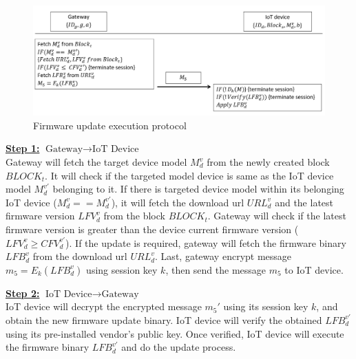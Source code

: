 \begin{figure}[H]
	\begin{center}
		\includegraphics[width=1.0\textwidth]{figures/firmware_update_execution_2.png}
		\caption{Firmware update execution protocol} 
		\label{fig:executionprocessprotocol}
	\end{center}
\end{figure}

\noindent \underline{\textbf{Step 1:}} $\text{Gateway}\rightarrow\text{IoT Device}$ \\
\indent Gateway will fetch the target device model $M_d^v$ from the newly created block $BLOCK_t$. It will check if the targeted model device is same as the IoT device model $M_d^{v'}$ belonging to it. If there is targeted device model within its belonging IoT device ($M_d^v == M_d^{v'}$), it will fetch the download url $URL_d^v$ and the latest firmware version $LFV_d^v$ from the block $BLOCK_t$. Gateway will check if the latest firmware version is greater than the device current firmware version ($LFV_d^v \geq CFV_d^{v'}$). If the update is required, gateway will fetch the firmware binary $LFB_d^v$ from the download url $URL_d^v$. Last, gateway encrypt message $m_5=E_k(LFB_d^v)$ using session key $k$, then send the message $m_5$ to IoT device.

\noindent \underline{\textbf{Step 2:}} $\text{IoT Device}\rightarrow\text{Gateway}$ \\
\indent IoT device will decrypt the encrypted message \textit{$m_5'$} using its session key \textit{$k$}, and obtain the new firmware update binary. IoT device will verify the obtained \textit{$LFB_d^{v'}$} using its pre-installed vendor's public key. Once verified, IoT device will execute the firmware binary \textit{$LFB_d^{v'}$} and do the update process.